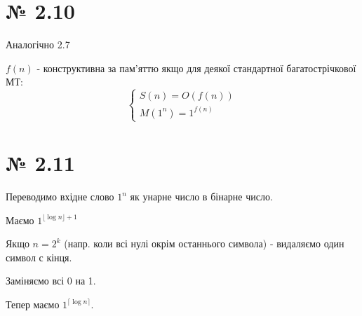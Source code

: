 \documentclass[11pt, a4paper]{article} %
\begin{document}
\section*{№ 2.10}
Аналогічно 2.7

\begin{mdframed}
    $f(n)$ - конструктивна за пам'яттю якщо для деякої стандартної багатострічкової МТ:
    $$
    \begin{cases}
        S(n) = O(f(n)) \\
        M(1^n) = 1^{f(n)}
    \end{cases}
    $$
\end{mdframed}

\section*{№ 2.11}
Переводимо вхідне слово $1^n$ як унарне число в бінарне число.

Маємо $1^{\lfloor \log n \rfloor + 1}$

Якщо $n = 2^k$ (напр. коли всі нулі окрім останнього символа) - видаляємо один символ с кінця.

Заміняємо всі 0 на 1.

Тепер маємо $1 ^ {\lceil \log n \rceil}$. \;\qedsymbol
\end{document}
